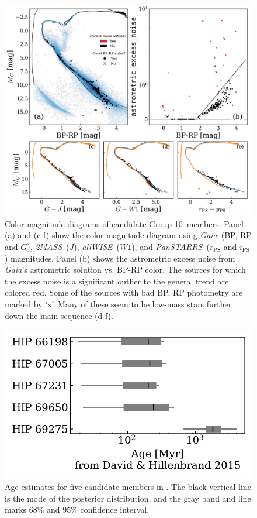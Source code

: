 \documentclass[modern,letterpaper]{aastex61}
\newcommand{\project}[1]{\textsl{#1}}
\newcommand{\acronym}[1]{{\small{#1}}}
\newcommand{\gaia}{\project{Gaia}}
\newcommand{\tmass}{\project{\acronym{2MASS}}}
\newcommand{\allwise}{\project{\acronym{allWISE}}}
\newcommand{\panstarrs}{\project{\acronym{PanSTARRS}}}
\newcommand{\groupTen}{Group 10}
\begin{document}
\begin{figure}
  \includegraphics[width=0.95\linewidth]{bp_rp_G.pdf}
  \caption{
    Color-magnitude diagrams of candidate \groupTen\ members.
    Panel (a) and (c-f) show the color-magnitude diagram using \gaia\ (BP, RP and $G$),
    \tmass\ ($J$), \allwise\ ($W1$), and \panstarrs\ ($r_\mathrm{PS}$ and $i_\mathrm{PS}$)
    magnitudes. Panel (b) shows the astrometric excess noise from \gaia's astrometric
    solution vs. BP-RP color. The sources for which the excess noise is a significant
    outlier to the general trend are colored red.
    Some of the sources with bad BP, RP photometry are marked by `x'.
    Many of these seem to be low-mass stars further down the main sequence (d-f).
  }
  \label{fig:cmd}
\end{figure}

\begin{figure}
  \includegraphics{age_DavidHillenbrand2015.pdf}
  \caption{Age estimates for five candidate members in \citet{2015ApJ...804..146D}.
    The black vertical line is the mode of the posterior distribution,
    and the gray band and line marks 68\% and 95\% confidence interval.
  }
  \label{fig:age_DavidHillenbrand2015}
\end{figure}
\end{document}
